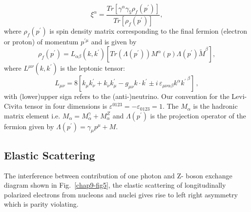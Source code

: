 \begin{equation}
\xi^\alpha =\frac{Tr[\gamma^\alpha \gamma_5\rho_f(p^\prime)]}{Tr[ \rho_f(p^\prime)] } , \label{chap9-eq14}
\end{equation}
where $\rho_f(p^\prime)$ is spin density matrix  corresponding to the final fermion (electron or proton) of momentum $p^{\prime\mu}$ and is given by 
\begin{equation}
\rho_f(p^\prime)= L_{ \alpha \beta}(k,k^\prime)[Tr(\Lambda(p^\prime) )M^\alpha(p)\Lambda(p^\prime)\tilde{M}^\beta] , \label{chap9-eq15}
\end{equation}
where $L^{\mu \nu}(k,k^\prime)$ is the leptonic tensor: 
\begin{equation}
    L_{\mu \nu}= 8 \left[  k_\mu  k^\prime_\nu  +  k_\nu  k^\prime_\mu  - g_{\mu \nu} k \cdot k^\prime 
    \pm  i \, \varepsilon_{\mu \nu \alpha \beta} k^\alpha {k^\prime \,}^\beta \right] \, , \label{chap9-eq16}
\end{equation}
with (lower)upper sign refers to the (anti-)neutrino. Our convention for the Levi-Civita tensor in four dimensions is 
$\varepsilon^{0123}=-\varepsilon_{0123}=1$. The $M_\alpha$ is the hadronic matrix element i.e. $M_\alpha=M_\alpha^\gamma+ M_\alpha^Z$ and $\Lambda(p^\prime)$ is the projection operator of the fermion given by $\Lambda(p^\prime)=\gamma_{\mu}p^{\mu}+M$.

\subsection{Elastic Scattering}\label{chap9-subsec3.1}

The interference between contribution of one photon and Z- boson  exchange diagram shown in Fig.~\ref{chap9-fig5}, the elastic scattering of longitudinally polarized electrons from nucleons and nuclei gives rise to left right asymmetry which is parity violating. 


